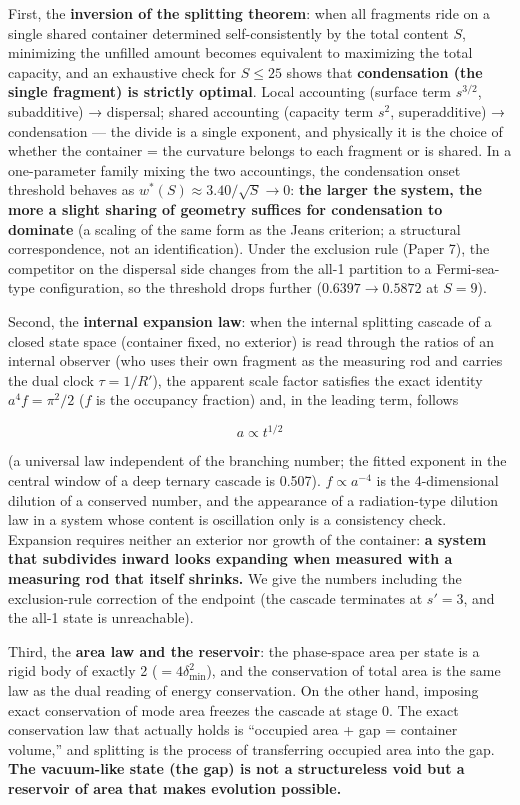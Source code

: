 \documentclass[
]{article}
\begin{document}
First, the \textbf{inversion of the splitting theorem}: when all
fragments ride on a single shared container determined self-consistently
by the total content \(S\), minimizing the unfilled amount becomes
equivalent to maximizing the total capacity, and an exhaustive check for
\(S\le25\) shows that \textbf{condensation (the single fragment) is
strictly optimal}. Local accounting (surface term \(s^{3/2}\),
subadditive) → dispersal; shared accounting (capacity term \(s^2\),
superadditive) → condensation --- the divide is a single exponent, and
physically it is the choice of whether the container = the curvature
belongs to each fragment or is shared. In a one-parameter family mixing
the two accountings, the condensation onset threshold behaves as
\(w^*(S)\approx 3.40/\sqrt S\to0\): \textbf{the larger the system, the
more a slight sharing of geometry suffices for condensation to dominate}
(a scaling of the same form as the Jeans criterion; a structural
correspondence, not an identification). Under the exclusion rule (Paper
7), the competitor on the dispersal side changes from the all-1
partition to a Fermi-sea-type configuration, so the threshold drops
further (\(0.6397\to0.5872\) at \(S=9\)).

Second, the \textbf{internal expansion law}: when the internal splitting
cascade of a closed state space (container fixed, no exterior) is read
through the ratios of an internal observer (who uses their own fragment
as the measuring rod and carries the dual clock \(\tau=1/R'\)), the
apparent scale factor satisfies the exact identity \(a^4 f=\pi^2/2\)
(\(f\) is the occupancy fraction) and, in the leading term, follows

\[
a\propto t^{1/2}
\]

(a universal law independent of the branching number; the fitted
exponent in the central window of a deep ternary cascade is 0.507).
\(f\propto a^{-4}\) is the 4-dimensional dilution of a conserved number,
and the appearance of a radiation-type dilution law in a system whose
content is oscillation only is a consistency check. Expansion requires
neither an exterior nor growth of the container: \textbf{a system that
subdivides inward looks expanding when measured with a measuring rod
that itself shrinks.} We give the numbers including the exclusion-rule
correction of the endpoint (the cascade terminates at \(s'=3\), and the
all-1 state is unreachable).

Third, the \textbf{area law and the reservoir}: the phase-space area per
state is a rigid body of exactly 2 (\(=4\delta_{\min}^2\)), and the
conservation of total area is the same law as the dual reading of energy
conservation. On the other hand, imposing exact conservation of mode
area freezes the cascade at stage 0. The exact conservation law that
actually holds is ``occupied area + gap = container volume,'' and
splitting is the process of transferring occupied area into the gap.
\textbf{The vacuum-like state (the gap) is not a structureless void but
a reservoir of area that makes evolution possible.}
\end{document}
